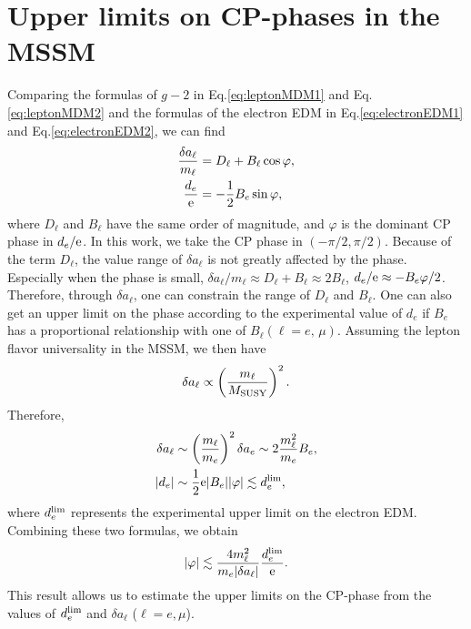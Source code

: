 \documentclass[a4paper,11pt]{article}
\begin{document}
   \section{Upper limits on CP-phases in the MSSM} \label{sec3}
   Comparing the formulas of $g-2$ in Eq.\eqref{eq:leptonMDM1} and Eq.\eqref{eq:leptonMDM2} and the formulas of the electron EDM in Eq.\eqref{eq:electronEDM1} and Eq.\eqref{eq:electronEDM2}, we can find
   \begin{align}
       \frac{\delta a_\ell}{m_\ell} &= D_\ell+B_\ell\cos\varphi,\\
       \frac{d_e}{\rm e} &= -\frac12 B_e\sin\varphi,
   \end{align}
   where $D_\ell$ and $B_\ell$ have the same order of magnitude, and $\varphi$ is the dominant CP phase in $d_e/{\rm e}$. In this work, we take the CP phase in $(-\pi/2,\pi/2)$. Because of the term $D_\ell$, the value range of $\delta a_\ell$ is not greatly affected by the phase. Especially when the phase is small, $\delta a_\ell/m_\ell\approx D_\ell+B_\ell\approx 2B_\ell$, $d_e/{\rm e}\approx -B_e\varphi/2$. Therefore, through $\delta a_\ell$, one can constrain the range of $D_\ell$ and $B_\ell$. One can also get an upper limit on the phase according to the experimental value of $d_e$ if $B_e$ has a proportional relationship with one of $B_\ell(\ell=e,\,\mu)$. Assuming the lepton flavor universality in the MSSM, we then have ~\cite{book:Jegerlehner:2017}
   \begin{equation}\label{eq:delta-alepton}
      \delta a_{\ell}\propto \left(\frac{m_{\ell}}{M_{\rm SUSY}}\right)^2.
   \end{equation}
   Therefore,
   \begin{align}
       \delta a_\ell &\sim\left(\frac{m_\ell}{m_e}\right)^2\delta a_e\sim2\frac{m^2_\ell}{m_e}B_e,\\
       |d_e| &\sim \frac{1}{2}{\rm e}|B_e||\varphi|\lesssim d_e^{\rm lim},
   \end{align}
   where $d_e^{\rm lim}$ represents the experimental upper limit on the electron EDM.
   Combining these two formulas, we obtain
   \begin{equation}\label{eq:phaselimit}
       |\varphi|\lesssim\frac{4m_\ell^2}{m_e|\delta a_\ell|} \frac{d_e^{\rm lim}}{\rm e}.
   \end{equation}
    This result allows us to estimate the upper limits on the CP-phase from the values of  $d_e^{\rm lim}$ and $\delta a_\ell$ ($\ell=e,\mu$). 
   
   
\end{document}
